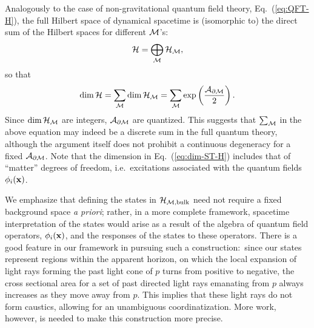 \documentclass[12pt]{article}
\begin{document}
Analogously to the case of non-gravitational quantum field theory, 
Eq.~(\ref{eq:QFT-H}), the full Hilbert space of dynamical spacetime 
is (isomorphic to) the direct sum of the Hilbert spaces for different 
${\cal M}$'s:
%
\begin{equation}
  {\cal H} = \bigoplus_{\cal M} {\cal H}_{\cal M},
\label{eq:ST-H}
\end{equation}
%
so that
%
\begin{equation}
  {\rm dim}\,{\cal H} 
    = \sum_{\cal M} {\rm dim}\,{\cal H}_{\cal M} 
    = \sum_{\cal M} 
      \exp\left(\frac{{\cal A}_{\partial {\cal M}}}{2}\right).
\label{eq:dim-ST-H}
\end{equation}
%
Since ${\rm dim}\,{\cal H}_{\cal M}$ are integers, ${\cal A}_{\partial 
{\cal M}}$ are quantized.  This suggests that $\sum_{\cal M}$ in the 
above equation may indeed be a discrete sum in the full quantum theory, 
although the argument itself does not prohibit a continuous degeneracy 
for a fixed ${\cal A}_{\partial {\cal M}}$.  Note that the dimension 
in Eq.~(\ref{eq:dim-ST-H}) includes that of ``matter'' degrees 
of freedom, i.e.\ excitations associated with the quantum fields 
$\phi_i({\bf x})$.

We emphasize that defining the states in ${\cal H}_{{\cal M}, {\rm bulk}}$ 
need not require a fixed background space {\it a priori}; rather, in a 
more complete framework, spacetime interpretation of the states would arise 
as a result of the algebra of quantum field operators, $\phi_i({\bf x})$, 
and the responses of the states to these operators.  There is a good 
feature in our framework in pursuing such a construction:\ since our 
states represent regions within the apparent horizon, on which the local 
expansion of light rays forming the past light cone of $p$ turns from 
positive to negative, the cross sectional area for a set of past directed 
light rays emanating from $p$ always increases as they move away from 
$p$.  This implies that these light rays do not form caustics, allowing 
for an unambiguous coordinatization.  More work, however, is needed to 
make this construction more precise.
\end{document}

